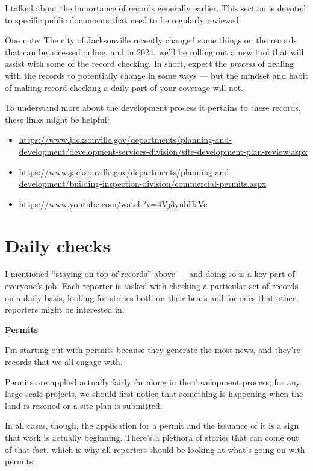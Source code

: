 \documentclass[
  11pt,
  american,
  letterpaperpaper,
  extrafontsizes,onecolumn,openright
  ]{memoir}
\providecommand{\tightlist}{%
  \setlength{\itemsep}{0pt}\setlength{\parskip}{0pt}}
\begin{document}
I talked about the importance of records generally earlier. This section is devoted to specific public documents that need to be regularly reviewed.

One note: The city of Jacksonville recently changed some things on the records that can be accessed online, and in 2024, we'll be rolling out a new tool that will assist with some of the record checking. In short, expect the \emph{process} of dealing with the records to potentially change in some ways --- but the mindset and habit of making record checking a daily part of your coverage will not.

To understand more about the development process it pertains to these records, these links might be helpful:

\begin{itemize}
\tightlist
\item
  \url{https://www.jacksonville.gov/departments/planning-and-development/development-services-division/site-development-plan-review.aspx}
\item
  \url{https://www.jacksonville.gov/departments/planning-and-development/building-inspection-division/commercial-permits.aspx}
\item
  \url{https://www.youtube.com/watch?v=4Vj3ynbHsVc}
\end{itemize}

\hypertarget{daily-checks}{%
\section*{Daily checks}\label{daily-checks}}

I mentioned \enquote{staying on top of records} above --- and doing so is a key part of everyone's job. Each reporter is tasked with checking a particular set of records on a daily basis, looking for stories both on their beats and for ones that other reporters might be interested in.

\newpage

\textbf{Permits}

I'm starting out with permits because they generate the most news, and they're records that we all engage with.

Permits are applied actually fairly far along in the development process; for any large-scale projects, we should first notice that something is happening when the land is rezoned or a site plan is submitted.

In all cases, though, the application for a permit and the issuance of it is a sign that work is actually beginning. There's a plethora of stories that can come out of that fact, which is why all reporters should be looking at what's going on with permits.
\end{document}
